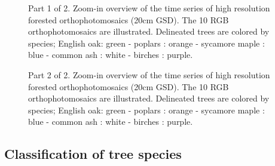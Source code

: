 \documentclass[remotesensing,article,submit,moreauthors,pdftex,12pt,a4paper]{mdpi} %
\begin{document}
\begin{figure}[H]
\centering
\captionsetup[subfigure]{labelformat=empty,singlelinecheck=true,margin=0pt, parskip=0pt,
hangindent=0pt, indention=0pt}
\hspace{5mm}
\hspace{0.05mm}
\hspace{5mm}
\hspace{0.05mm}
\hspace{5mm}
\hspace{0.05mm}
\caption{ Part 1 of 2. Zoom-in overview of the time series of high resolution forested orthophotomosaics (20cm GSD). The 10 RGB orthophotomosaics are illustrated. Delineated trees are colored by species; English oak: green - poplars : orange - sycamore maple : blue - common ash : white - birches : purple.}
\label{fig:TS_zoomin}
\end{figure}

\begin{figure}[H]
\centering
\captionsetup[subfigure]{labelformat=empty,singlelinecheck=true,margin=0pt, parskip=0pt,
hangindent=0pt, indention=0pt}
\ContinuedFloat 
{}\hspace{5mm}
\hspace{0.05mm}
\hspace{5mm}
\hspace{0.05mm}
\caption{Part 2 of 2. Zoom-in overview of the time series of high resolution forested orthophotomosaics (20cm GSD). The 10 RGB orthophotomosaics are illustrated. Delineated trees are colored by species; English oak: green - poplars : orange - sycamore maple : blue - common ash : white - birches : purple.}
\label{fig:TS_zoomin}
\end{figure}

\subsection{Classification of tree species}
\end{document}
